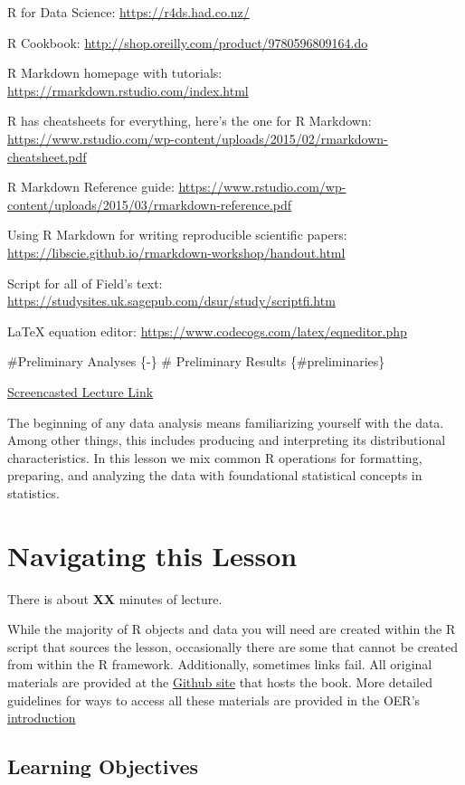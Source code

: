 \documentclass[
  11pt,
]{book}
\begin{document}
R for Data Science: \url{https://r4ds.had.co.nz/}

R Cookbook: \url{http://shop.oreilly.com/product/9780596809164.do}

R Markdown homepage with tutorials: \url{https://rmarkdown.rstudio.com/index.html}

R has cheatsheets for everything, here's the one for R Markdown: \url{https://www.rstudio.com/wp-content/uploads/2015/02/rmarkdown-cheatsheet.pdf}

R Markdown Reference guide: \url{https://www.rstudio.com/wp-content/uploads/2015/03/rmarkdown-reference.pdf}

Using R Markdown for writing reproducible scientific papers: \url{https://libscie.github.io/rmarkdown-workshop/handout.html}

Script for all of Field's text: \url{https://studysites.uk.sagepub.com/dsur/study/scriptfi.htm}

LaTeX equation editor: \url{https://www.codecogs.com/latex/eqneditor.php}

\#Preliminary Analyses \{-\}
\# Preliminary Results \{\#preliminaries\}

\href{}{Screencasted Lecture Link}

The beginning of any data analysis means familiarizing yourself with the data. Among other things, this includes producing and interpreting its distributional characteristics. In this lesson we mix common R operations for formatting, preparing, and analyzing the data with foundational statistical concepts in statistics.

\hypertarget{navigating-this-lesson-1}{%
\section{Navigating this Lesson}\label{navigating-this-lesson-1}}

There is about \textbf{XX} minutes of lecture.

While the majority of R objects and data you will need are created within the R script that sources the lesson, occasionally there are some that cannot be created from within the R framework. Additionally, sometimes links fail. All original materials are provided at the \href{https://github.com/lhbikos/ReCenterPsychStats}{Github site} that hosts the book. More detailed guidelines for ways to access all these materials are provided in the OER's \protect\hyperlink{ReCintro}{introduction}

\hypertarget{learning-objectives-1}{%
\subsection{Learning Objectives}\label{learning-objectives-1}}
\end{document}
